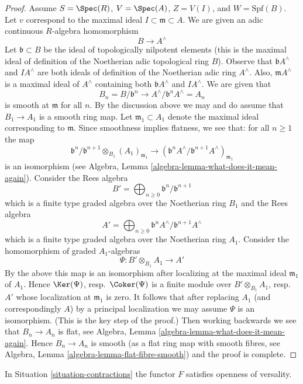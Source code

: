 \begin{proof}
\medskip\noindent
Assume $S = \Spec(R)$, $V = \Spec(A)$, $Z = V(I)$, and $W = \text{Spf}(B)$.
Let $v$ correspond to the maximal ideal $I \subset \mathfrak m \subset A$.
We are given an adic continuous $R$-algebra homomorphism
$$
B \longrightarrow A^\wedge
$$
Let $\mathfrak b \subset B$ be the ideal of topologically nilpotent
elements (this is the maximal ideal of definition of the Noetherian adic
topological ring $B$). Observe that $\mathfrak b A^\wedge$ and
$IA^\wedge$ are both ideals of definition of the Noetherian adic
ring $A^\wedge$. Also, $\mathfrak m A^\wedge$ is a maximal ideal
of $A^\wedge$ containing both $\mathfrak b A^\wedge$ and $IA^\wedge$.
We are given that
$$
B_n = B/\mathfrak b^n \to A^\wedge/\mathfrak b^n A^\wedge = A_n
$$
is smooth at $\mathfrak m$ for all $n$. By the discussion above
we may and do assume that $B_1 \to A_1$ is a smooth ring map.
Let $\mathfrak m_1 \subset A_1$ denote the maximal ideal corresponding
to $\mathfrak m$. Since smoothness implies flatness, we see that:
for all $n \geq 1$ the map
$$
\mathfrak b^n/\mathfrak b^{n + 1} \otimes_{B_1} (A_1)_{\mathfrak m_1}
\longrightarrow
\left(\mathfrak b^nA^\wedge/\mathfrak b^{n + 1}A^\wedge\right)_{\mathfrak m_1}
$$
is an isomorphism (see
Algebra, Lemma \ref{algebra-lemma-what-does-it-mean-again}).
Consider the Rees algebra
$$
B' = \bigoplus\nolimits_{n \geq 0} \mathfrak b^n/\mathfrak b^{n + 1}
$$
which is a finite type graded algebra over the Noetherian ring $B_1$ and
the Rees algebra
$$
A' = \bigoplus\nolimits_{n \geq 0}
\mathfrak b^nA^\wedge/\mathfrak b^{n + 1}A^\wedge
$$
which is a finite type graded algebra over the Noetherian ring $A_1$.
Consider the homomorphism of graded $A_1$-algebras
$$
\Psi : B' \otimes_{B_1} A_1 \longrightarrow A'
$$
By the above this map is an isomorphism after localizing at
the maximal ideal $\mathfrak m_1$ of $A_1$.
Hence $\Ker(\Psi)$, resp.\ $\Coker(\Psi)$ is a finite module
over $B' \otimes_{B_1} A_1$, resp.\ $A'$ whose localization
at $\mathfrak m_1$ is zero. It follows that after replacing
$A_1$ (and correspondingly $A$) by a principal localization
we may assume $\Psi$ is an isomorphism. (This is the key step of the proof.)
Then working backwards we see that $B_n \to A_n$ is flat, see
Algebra, Lemma \ref{algebra-lemma-what-does-it-mean-again}.
Hence $B_n \to A_n$ is smooth (as a flat ring map with smooth
fibres, see Algebra, Lemma \ref{algebra-lemma-flat-fibre-smooth})
and the proof is complete.
\end{proof}

\begin{lemma}
\label{lemma-openness-versality}
In Situation \ref{situation-contractions} the functor
$F$ satisfies openness of versality.
\end{lemma}

